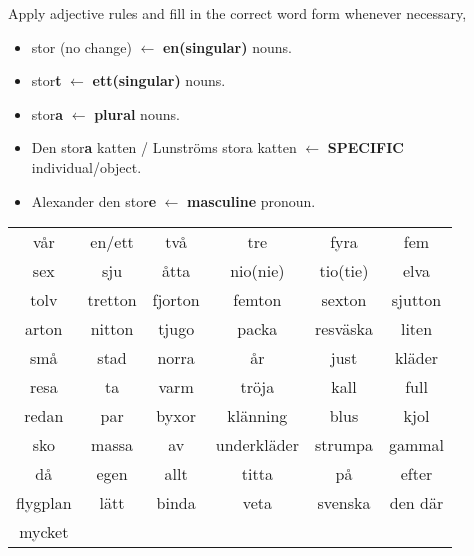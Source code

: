 \begin{flushleft}
    Apply adjective rules and fill in the correct word form whenever necessary, \\
    \begin{itemize}
        \item stor (no change) $\leftarrow$ \textbf{en(singular)} nouns.
        \item stor\textbf{t} $\leftarrow$ \textbf{ett(singular)} nouns.
        \item stor\textbf{a} $\leftarrow$ \textbf{plural} nouns.
        \item Den stor\textbf{a} katten / Lunströms stora katten $\leftarrow$ \textbf{SPECIFIC} individual/object.
        \item Alexander den stor\textbf{e} $\leftarrow$ \textbf{masculine} pronoun.
    \end{itemize}
\end{flushleft}
\begin{center}
    \begin{tabular}{|c c c c c c|}
        \hline
        vår & en/ett & två & tre & fyra & fem \\
        sex & sju & åtta & nio(nie) & tio(tie) & elva \\
        tolv & tretton & fjorton & femton & sexton & sjutton \\
        arton & nitton & tjugo & packa & resväska & liten \\
        små & stad & norra & år & just &  kläder \\
        resa & ta & varm & tröja & kall & full  \\
        redan & par & byxor & klänning & blus & kjol  \\
        sko & massa & av & underkläder & strumpa & gammal \\
        då & egen & allt & titta & på &  efter \\
        flygplan & lätt & binda & veta & svenska & den där \\
        mycket &&&&& \\
        \hline
    \end{tabular}
\end{center}

